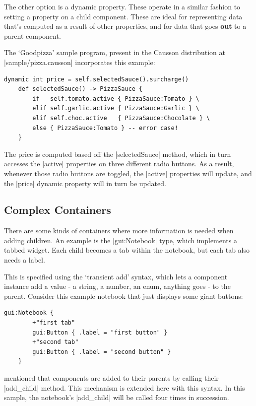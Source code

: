 \documentclass[11pt]{report}
\begin{document}
The other option is a dynamic property. These operate in a similar fashion to setting a property on a child component. These are ideal for representing data that's computed as a result of other properties, and for data that goes \textbf{out} to a parent component.

The `Goodpizza' sample program, present in the Causson distribution at |sample/pizza.causson| incorporates this example:

\begin{Verbatim}[commandchars=^$&]
	dynamic int price = self.selectedSauce().surcharge()
	def selectedSauce() -> PizzaSauce {
		if   self.tomato.active { PizzaSauce:Tomato } \
		elif self.garlic.active { PizzaSauce:Garlic } \
		elif self.choc.active   { PizzaSauce:Chocolate } \
		else { PizzaSauce:Tomato } -- error case!
	}
\end{Verbatim}

The price is computed based off the |selectedSauce| method, which in turn accesses the |active| properties on three different radio buttons. As a result, whenever those radio buttons are toggled, the |active| properties will update, and the |price| dynamic property will in turn be updated.

\subsection{Complex Containers}

There are some kinds of containers where more information is needed when adding children. An example is the |gui:Notebook| type, which implements a tabbed widget. Each child becomes a tab within the notebook, but each tab also needs a label.

This is specified using the `transient add' syntax, which lets a component instance add a value - a string, a number, an enum, anything goes - to the parent. Consider this example notebook that just displays some giant buttons:

\begin{Verbatim}[commandchars=^$&]
    gui:Notebook {
        +"first tab"
        gui:Button { .label = "first button" }
        +"second tab"
        gui:Button { .label = "second button" }
    }
\end{Verbatim}

 mentioned that components are added to their parents by calling their |add_child| method. This mechanism is extended here with this syntax. In this sample, the notebook's |add_child| will be called four times in succession.
\end{document}
